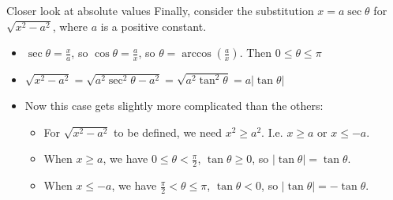 \begin{frame}[t]{Closer look at absolute values\hfill \hyperlink{EndOfAbsValueDiscussion}{}}
Finally, consider the substitution $x=a\sec \theta$ for $\sqrt{x^2-a^2}$, where $a$ is a positive constant.\pause
\begin{itemize}[<+-|handout:0>]\color{spoilercolor}
\item $\sec \theta = \frac{x}{a}$, so $\cos \theta=\frac{a}{x}$, so $\theta= \arccos\left(\frac{a}{x}\right)$. Then $0 \le \theta \le \pi$
\item $\sqrt{x^2-a^2}=\sqrt{a^2\sec^2\theta-a^2}=\sqrt{a^2\tan^2\theta}=a|\tan\theta|$
\item Now this case gets slightly more complicated than the others:
\begin{itemize}
\item For $\sqrt{x^2-a^2}$ to be defined, we need $x^2\ge a^2$. I.e. $x\ge a$ or $x\le -a$.
\item When $x\ge a$, we have $0 \le \theta <\frac{\pi}{2}$, $\tan\theta \ge 0$, so $|\tan \theta|=\tan\theta$.
\item When $x\le -a$, we have $\frac{\pi}{2}< \theta \le \pi$, $\tan\theta<0$, so $|\tan \theta|=-\tan\theta$.
\end{itemize}
\end{itemize}
\end{frame}

